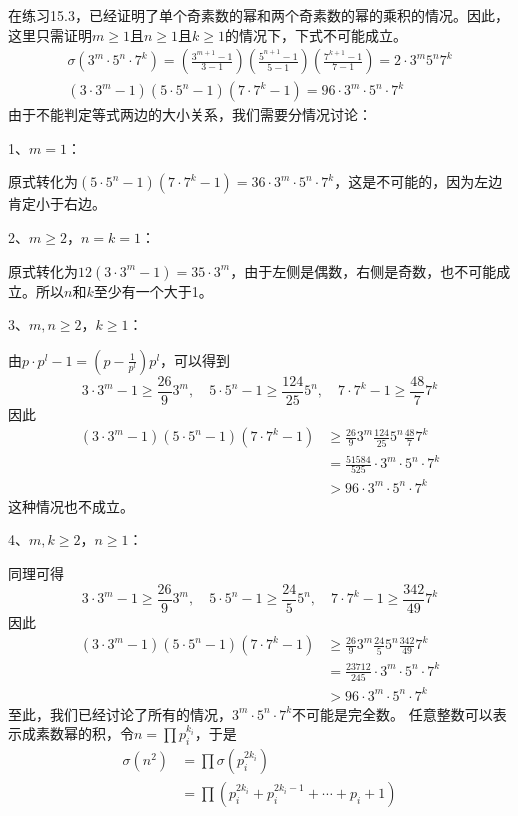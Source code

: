 %
\exercise 在练习15.3，已经证明了单个奇素数的幂和两个奇素数的幂的乘积的情况。因此，这里只需证明$m\ge1$且$n\ge1$且$k\ge1$的情况下，下式不可能成立。
\begin{gather*}
\sigma(3^m\cdot5^n\cdot7^k)=\left(\frac{3^{m+1}-1}{3-1}\right)\left(\frac{5^{n+1}-1}{5-1}\right)\left(\frac{7^{k+1}-1}{7-1}\right)=2\cdot3^m5^n7^k \\
(3\cdot3^m-1)(5\cdot5^n-1)(7\cdot7^k-1)=96\cdot3^m\cdot5^n\cdot7^k
\end{gather*}
由于不能判定等式两边的大小关系，我们需要分情况讨论：\par
1、$m=1$：\par
原式转化为$(5\cdot5^n-1)(7\cdot7^k-1)=36\cdot3^m\cdot5^n\cdot7^k$，这是不可能的，因为左边肯定小于右边。\par
2、$m\ge 2$，$n=k=1$：\par
原式转化为$12(3\cdot3^m-1)=35\cdot3^m$，由于左侧是偶数，右侧是奇数，也不可能成立。所以$n$和$k$至少有一个大于1。\par
3、$m,n\ge2$，$k\ge1$：\par
由$p\cdot p^l-1=(p-\frac{1}{p^l})p^l$，可以得到
\[3\cdot3^m-1\ge\frac{26}{9}3^m,\quad 5\cdot5^n-1\ge\frac{124}{25}5^n,\quad 7\cdot7^k-1\ge\frac{48}{7}7^k\]
因此
\begin{align*}
(3\cdot3^m-1)(5\cdot5^n-1)(7\cdot7^k-1)&\ge \frac{26}{9}3^m\frac{124}{25}5^n\frac{48}{7}7^k \\
&=\frac{51584}{525}\cdot3^m\cdot5^n\cdot7^k\\
&>96\cdot3^m\cdot5^n\cdot7^k
\end{align*}
这种情况也不成立。\par
4、$m,k\ge2$，$n\ge1$：\par
同理可得
\[3\cdot3^m-1\ge\frac{26}{9}3^m,\quad 5\cdot5^n-1\ge\frac{24}{5}5^n,\quad 7\cdot7^k-1\ge\frac{342}{49}7^k\]
因此
\begin{align*}
(3\cdot3^m-1)(5\cdot5^n-1)(7\cdot7^k-1)&\ge \frac{26}{9}3^m\frac{24}{5}5^n\frac{342}{49}7^k \\
&=\frac{23712}{245}\cdot3^m\cdot5^n\cdot7^k\\
&>96\cdot3^m\cdot5^n\cdot7^k
\end{align*}
至此，我们已经讨论了所有的情况，$3^m\cdot5^n\cdot7^k$不可能是完全数。
%
\exercise 任意整数可以表示成素数幂的积，令$n=\prod p_i^{k_i}$，于是
\begin{align*}
\sigma(n^2)&=\prod\sigma(p_i^{2k_i}) \\
&=\prod(p_i^{2k_i}+p_i^{2k_i-1}+\cdots+p_i+1)
\end{align*}
